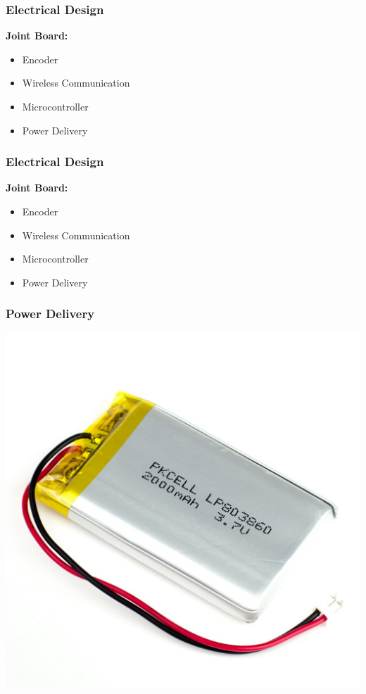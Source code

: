 \documentclass[mathserif]{beamer}
\begin{document}
\begin{frame}[c]\frametitle{Electrical Design}
\textbf{Joint Board:}
	\begin{itemize}
    	\item Encoder
    	\pause
    	\item Wireless Communication
    	\pause
    	\item Microcontroller
    	\pause
    	\item Power Delivery
    \end{itemize}    
\end{frame}

\begin{frame}[c]\frametitle{Electrical Design}
\textbf{Joint Board:}
	\begin{itemize}
    	\item Encoder
    	\item Wireless Communication
    	\item Microcontroller
    	\item \alert{Power Delivery}
    \end{itemize}    
\end{frame}

\begin{frame}[c]\frametitle{Power Delivery}
	\centering
	\vfill
    \includegraphics[width=.35\linewidth]{graphics/lipo}\\
    \vfill
    \vfill
\end{frame}
\end{document}
